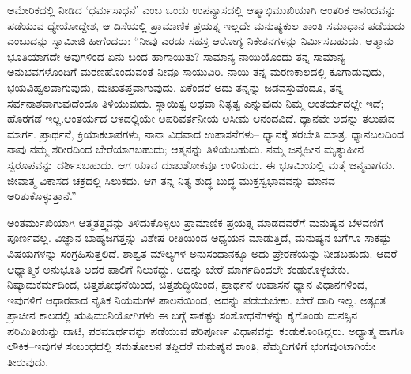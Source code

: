 ಅಮೇರಿಕದಲ್ಲಿ ನೀಡಿದ ‘ಧರ್ಮಸಾಧನೆ’ ಎಂಬ ಒಂದು ಉಪನ್ಯಾಸದಲ್ಲಿ ಆತ್ಮಾಭಿಮುಖಿಯಾಗಿ ಆಂತರಿಕ ಆನಂದವನ್ನು ಪಡೆಯುವ ಧ್ಯೇಯೋದ್ದೇಶ, ಆ ದಿಸೆಯಲ್ಲಿ ಪ್ರಾಮಾಣಿಕ ಪ್ರಯತ್ನ ಇಲ್ಲದೇ ಮನುಷ್ಯಕುಲ ಶಾಂತಿ ಸಮಾಧಾನ ಪಡೆಯದು ಎಂಬುದನ್ನು ಸ್ವಾಮೀಜಿ ಹೀಗೆಂದರು: “ನೀವು ಎರಡು ಸಹಸ್ರ ಆರೋಗ್ಯ ನಿಕೇತನಗಳನ್ನು ನಿರ್ಮಿಸಬಹುದು. ಆತ್ಮಾನು ಭೂತಿಯಾಗದೇ ಅವುಗಳಿಂದ ಏನು ಬಂದ ಹಾಗಾಯಿತು? ಸಾಮಾನ್ಯ ನಾಯಿಯೊಂದು ತನ್ನ ಸಾಮಾನ್ಯ ಅನುಭವಗಳೊಂದಿಗೆ ಮರಣಹೊಂದುವಂತೆ ನೀವೂ ಸಾಯುವಿರಿ. ನಾಯಿ ತನ್ನ ಮರಣಕಾಲದಲ್ಲಿ ಕೂಗಾಡುವುದು, ಭಯವಿಹ್ವಲವಾಗುವುದು, ದುಃಖತಪ್ತವಾಗುವುದು. ಏಕೆಂದರೆ ಅದು ತನ್ನನ್ನು ಜಡವಸ್ತುವೆಂದೂ, ತನ್ನ ಸರ್ವನಾಶವಾಗುವುದೆಂದೂ ತಿಳಿಯುವುದು. ಸ್ಥಾಯಿತ್ವ ಅಥವಾ ನಿತ್ಯತ್ವ ಎನ್ನುವುದು ನಿಮ್ಮ ಆಂತರ್ಯದಲ್ಲೇ ಇದೆ; ಹೊರಗಡೆ ಇಲ್ಲ.\break ಆಂತರ್ಯದ ಆಳದಲ್ಲಿಯೇ ಅಪರಿವರ್ತನೀಯ ಅಸೀಮ ಆನಂದವಿದೆ. ಧ್ಯಾನವೇ ಅದನ್ನು ತಲುಪುವ ಮಾರ್ಗ. ಪ್ರಾರ್ಥನೆ, ಕ್ರಿಯಾಕಲಾಪಗಳು, ನಾನಾ ವಿಧವಾದ ಉಪಾಸನೆಗಳು– ಧ್ಯಾನಕ್ಕೆ ತರಬೇತಿ ಮಾತ್ರ. ಧ್ಯಾನಬಲದಿಂದ ನಾವು ನಮ್ಮ ಶರೀರದಿಂದ ಬೇರೆಯಾಗಬಹುದು; ಆತ್ಮನನ್ನು ತಿಳಿಯಬಹುದು. ನಮ್ಮ ಜನ್ಮಹೀನ ಮೃತ್ಯುಹೀನ ಸ್ವರೂಪವನ್ನು ದರ್ಶಿಸಬಹುದು. ಆಗ ಯಾವ ದುಃಖಶೋಕವೂ ಉಳಿಯದು. ಈ ಭೂಮಿಯಲ್ಲಿ ಮತ್ತೆ ಜನ್ಮವಾಗದು. ಜೀವಾತ್ಮ ವಿಕಾಸದ ಚಕ್ರದಲ್ಲಿ ಸಿಲುಕದು. ಆಗ ತನ್ನ ನಿತ್ಯ ಶುದ್ಧ ಬುದ್ಧ ಮುಕ್ತಸ್ವಭಾವವನ್ನು ಮಾನವ ಅರಿತುಕೊಳ್ಳುತ್ತಾನೆ.”

ಅಂತರ್ಮುಖಿಯಾಗಿ ಆತ್ಮತತ್ತ್ವವನ್ನು ತಿಳಿದುಕೊಳ್ಳಲು ಪ್ರಾಮಾಣಿಕ ಪ್ರಯತ್ನ ಮಾಡದವರೆಗೆ ಮನುಷ್ಯನ ಬೆಳವಣಿಗೆ ಪೂರ್ಣವಲ್ಲ. ವಿಜ್ಞಾನ ಬಾಹ್ಯಜಗತ್ತನ್ನು ವಿಶೇಷ ರೀತಿಯಿಂದ ಅಧ್ಯಯನ ಮಾಡುತ್ತಿದೆ, ಮನುಷ್ಯನ ಬಗೆಗೂ ಸಾಕಷ್ಟು ವಿಷಯಗಳನ್ನು ಸಂಗ್ರಹಿಸುತ್ತಲಿದೆ. ಶಾಶ್ವತ ಮೌಲ್ಯಗಳ ಅನುಸಂಧಾನಕ್ಕೂ ಅದು ಪ್ರೇರಣೆಯನ್ನು ನೀಡಬಹುದು. ಆದರೆ ಆಧ್ಯಾತ್ಮಿಕ ಅನುಭೂತಿ ಅದರ ಪಾಲಿಗೆ ನಿಲುಕದ್ದು. ಅದನ್ನು ಬೇರೆ ಮಾರ್ಗದಿಂದಲೇ ಕಂಡುಕೊಳ್ಳಬೇಕು. ನಿಷ್ಕಾಮಕರ್ಮದಿಂದ, ಚಿತ್ತಶೋಧನೆಯಿಂದ, ಚಿತ್ತಶುದ್ಧಿಯಿಂದ, ಪ್ರಾರ್ಥನೆ ಉಪಾಸನೆ ಧ್ಯಾನ ವಿಧಾನಗಳಿಂದ, ಇವುಗಳಿಗೆ ಆಧಾರವಾದ ನೈತಿಕ ನಿಯಮಗಳ ಪಾಲನೆಯಿಂದ, ಅದನ್ನು ಪಡೆಯಬೇಕು. ಬೇರೆ ದಾರಿ ಇಲ್ಲ. ಅತ್ಯಂತ ಪ್ರಾಚೀನ ಕಾಲದಲ್ಲಿ ಋಷಿಮುನಿಯೋಗಿಗಳು ಈ ಬಗ್ಗೆ ಸಾಕಷ್ಟು ಸಂಶೋಧನೆಗಳನ್ನು ಕೈಗೊಂಡು ಮನಸ್ಸಿನ ಪರಿಮಿತಿಯನ್ನು ದಾಟಿ, ಪರಮಾರ್ಥವನ್ನು ಪಡೆಯುವ ಪರಿಪೂರ್ಣ ವಿಧಾನವನ್ನು ಕಂಡುಕೊಂಡಿದ್ದರು. ಅಧ್ಯಾತ್ಮ ಹಾಗೂ ಲೌಕಿಕ–ಇವುಗಳ ಸಂಬಂಧದಲ್ಲಿ ಸಮತೋಲನ ತಪ್ಪಿದರೆ ಮನುಷ್ಯನ ಶಾಂತಿ, ನೆಮ್ಮದಿಗಳಿಗೆ ಭಂಗವುಂಟಾಗಿಯೇ ತೀರುವುದು.

